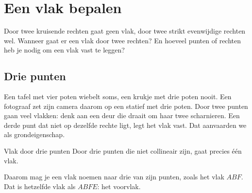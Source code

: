 \section{Een vlak bepalen}

Door twee kruisende rechten gaat geen vlak, door twee strikt evenwijdige rechten wel. Wanneer gaat er een vlak door twee rechten? En hoeveel punten of rechten heb je nodig om een vlak vast te leggen?

\subsection{Drie punten}

Een tafel met vier poten wiebelt soms, een krukje met drie poten nooit. Een fotograaf zet zijn camera daarom op een statief met drie poten. Door twee punten gaan veel vlakken: denk aan een deur die draait om haar twee scharnieren. Een derde punt dat niet op dezelfde rechte ligt, legt het vlak vast. Dat aanvaarden we als grondeigenschap.

\begin{theorie}
\begin{stelling}{Vlak door drie punten}
Door drie punten die niet collineair zijn, gaat precies één vlak.
\end{stelling}
\end{theorie}

Daarom mag je een vlak noemen naar drie van zijn punten, zoals het vlak $ABF$. Dat is hetzelfde vlak als $ABFE$: het voorvlak.


